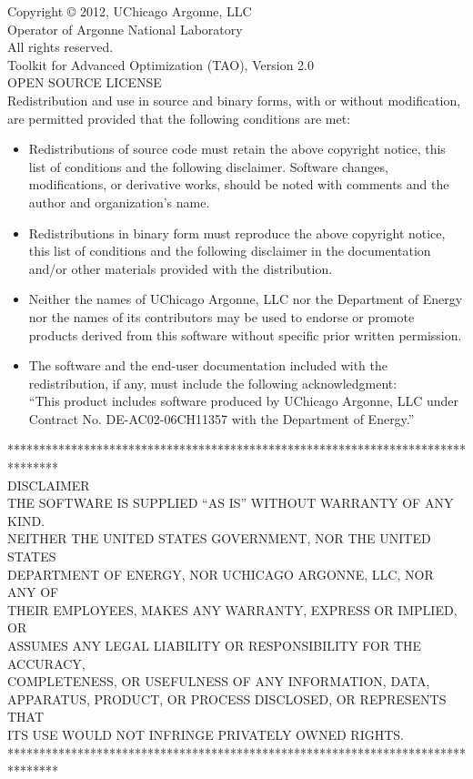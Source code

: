 \noindent
Copyright © 2012, UChicago Argonne, LLC \\
Operator of Argonne National Laboratory \\
All rights reserved. \\
Toolkit for Advanced Optimization (TAO), Version 2.0 \\
OPEN SOURCE LICENSE \\

\noindent
Redistribution and use in source and binary forms, with or without modification, are permitted provided that the following conditions are met:
\begin{itemize}
\item    Redistributions of source code must retain the above copyright notice, this list of conditions and the following disclaimer. Software changes, modifications, or derivative works, should be noted with comments and the author and organization's name. \\
\item    Redistributions in binary form must reproduce the above copyright notice, this list of conditions and the following disclaimer in the documentation and/or other materials provided with the distribution. \\
\item    Neither the names of UChicago Argonne, LLC nor the Department of Energy nor the names of its contributors may be used to endorse or promote products derived from this software without specific prior written permission. \\
\item    The software and the end-user documentation included with the redistribution, if any, must include the following acknowledgment:\\
    ``This product includes software produced by UChicago Argonne, LLC under Contract No. DE-AC02-06CH11357 with the Department of Energy.''
\end{itemize}

\noindent
********************************************************************************\\
\noindent
DISCLAIMER \\

\noindent
THE SOFTWARE IS SUPPLIED ``AS IS'' WITHOUT WARRANTY OF ANY KIND.\\
NEITHER THE UNITED STATES GOVERNMENT, NOR THE UNITED STATES\\
DEPARTMENT OF ENERGY, NOR UCHICAGO ARGONNE, LLC, NOR ANY OF\\
THEIR EMPLOYEES, MAKES ANY WARRANTY, EXPRESS OR IMPLIED, OR\\
ASSUMES ANY LEGAL LIABILITY OR RESPONSIBILITY FOR THE ACCURACY,\\
COMPLETENESS, OR USEFULNESS OF ANY INFORMATION, DATA,\\
APPARATUS, PRODUCT, OR PROCESS DISCLOSED, OR REPRESENTS THAT\\
ITS USE WOULD NOT INFRINGE PRIVATELY OWNED RIGHTS.\\

\noindent
********************************************************************************\\
